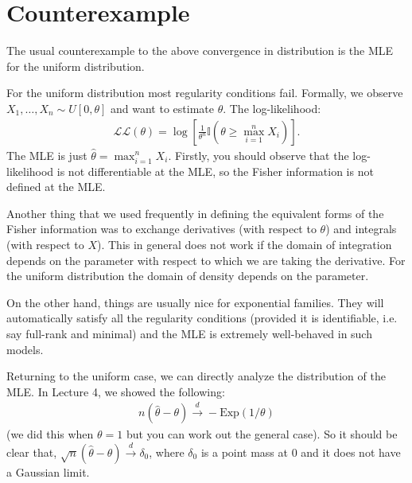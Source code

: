 \documentclass[twoside,12pt]{article}
\newcommand{\cdist}{\overset{d}{\rightarrow}}
\begin{document}
\section{Counterexample}
The usual counterexample to the above convergence in distribution is the MLE for the uniform distribution.

For the uniform distribution most regularity conditions fail. Formally, we observe $X_1,\ldots,X_n \sim U[0,\theta]$ and want to estimate $\theta$. The log-likelihood:
\begin{align*}
\mathcal{LL}(\theta) = \log \left[ \frac{1}{\theta^n} \mathbb{I}(\theta \geq \max_{i=1}^n X_i)\right]. 
\end{align*}
The MLE is just $\widehat{\theta} = \max_{i=1}^n X_i.$
Firstly, you should observe that the log-likelihood is not differentiable at the MLE, so the Fisher information is not defined at the MLE. 

Another thing that we used frequently in defining the equivalent forms of the Fisher information was to exchange derivatives (with respect to $\theta$) and integrals (with respect to $X$). This in general does not work if the domain of integration depends on the parameter with respect to which we are taking the derivative. For the uniform distribution the domain of density depends on the parameter.

On the other hand, things are usually nice for exponential families. They will automatically satisfy all the regularity conditions (provided it is identifiable, i.e. say full-rank and minimal) and the MLE is extremely well-behaved in such models.

Returning to the uniform case, we can directly analyze the distribution of the MLE. In Lecture 4, we showed the following:
\begin{align*}
n(\widehat{\theta} - \theta) \cdist - \text{Exp}(1/\theta)
\end{align*}
(we did this when $\theta = 1$ but you can work out the general case). So it should be clear that, $\sqrt{n}(\widehat{\theta} - \theta) \cdist \delta_0$, where $\delta_0$ is a point mass at 0 and it does not have a Gaussian limit.
\end{document}
